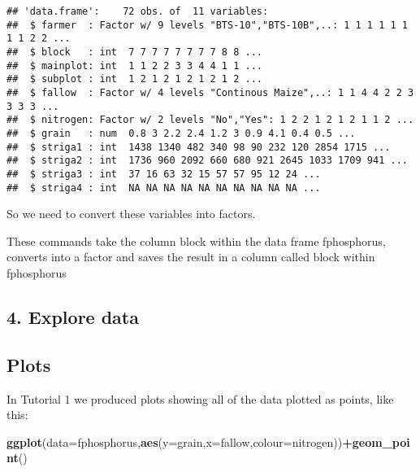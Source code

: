 \documentclass[]{book}
\newenvironment{Shaded}{\begin{snugshade}}{\end{snugshade}}
\newcommand{\KeywordTok}[1]{\textcolor[rgb]{0.13,0.29,0.53}{\textbf{#1}}}
\newcommand{\DataTypeTok}[1]{\textcolor[rgb]{0.13,0.29,0.53}{#1}}
\newcommand{\OperatorTok}[1]{\textcolor[rgb]{0.81,0.36,0.00}{\textbf{#1}}}
\newcommand{\NormalTok}[1]{#1}
\theoremstyle{definition}
\theoremstyle{definition}
\theoremstyle{definition}
\theoremstyle{remark}
\begin{document}
\begin{verbatim}
## 'data.frame':    72 obs. of  11 variables:
##  $ farmer  : Factor w/ 9 levels "BTS-10","BTS-10B",..: 1 1 1 1 1 1 1 1 2 2 ...
##  $ block   : int  7 7 7 7 7 7 7 7 8 8 ...
##  $ mainplot: int  1 1 2 2 3 3 4 4 1 1 ...
##  $ subplot : int  1 2 1 2 1 2 1 2 1 2 ...
##  $ fallow  : Factor w/ 4 levels "Continous Maize",..: 1 1 4 4 2 2 3 3 3 3 ...
##  $ nitrogen: Factor w/ 2 levels "No","Yes": 1 2 2 1 2 1 2 1 1 2 ...
##  $ grain   : num  0.8 3 2.2 2.4 1.2 3 0.9 4.1 0.4 0.5 ...
##  $ striga1 : int  1438 1340 482 340 98 90 232 120 2854 1715 ...
##  $ striga2 : int  1736 960 2092 660 680 921 2645 1033 1709 941 ...
##  $ striga3 : int  37 16 63 32 15 57 57 95 12 24 ...
##  $ striga4 : int  NA NA NA NA NA NA NA NA NA NA ...
\end{verbatim}

So we need to convert these variables into factors.

\begin{Shaded}
\end{Shaded}

These commands take the column block within the data frame fphosphorus,
converts into a factor and saves the result in a column called block
within fphosphorus

\subsection{4. Explore data}\label{explore-data-1}

\subsection{Plots}\label{plots-1}

In Tutorial 1 we produced plots showing all of the data plotted as
points, like this:

\begin{Shaded}
\begin{Highlighting}[]
\KeywordTok{ggplot}\NormalTok{(}\DataTypeTok{data=}\NormalTok{fphosphorus,}\KeywordTok{aes}\NormalTok{(}\DataTypeTok{y=}\NormalTok{grain,}\DataTypeTok{x=}\NormalTok{fallow,}\DataTypeTok{colour=}\NormalTok{nitrogen))}\OperatorTok{+}\KeywordTok{geom_point}\NormalTok{()}
\end{Highlighting}
\end{Shaded}
\end{document}
